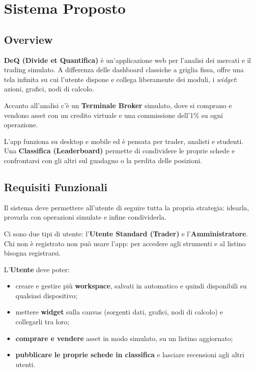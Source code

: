 \section{Sistema Proposto}

\subsection{Overview}
\textbf{DeQ (Divide et Quantifica)} è un'applicazione web per l'analisi dei mercati e il trading simulato. A differenza delle dashboard classiche a griglia fissa, offre una tela infinita su cui l'utente dispone e collega liberamente dei moduli, i \textit{widget}: azioni, grafici, nodi di calcolo.

Accanto all'analisi c'è un \textbf{Terminale Broker} simulato, dove si comprano e vendono asset con un credito virtuale e una commissione dell'1\% su ogni operazione.

L'app funziona su desktop e mobile ed è pensata per trader, analisti e studenti. Una \textbf{Classifica (Leaderboard)} permette di condividere le proprie schede e confrontarsi con gli altri sul guadagno o la perdita delle posizioni.

\subsection{Requisiti Funzionali}
Il sistema deve permettere all'utente di seguire tutta la propria strategia: idearla, provarla con operazioni simulate e infine condividerla.

Ci sono due tipi di utente: l'\textbf{Utente Standard (Trader)} e l'\textbf{Amministratore}. Chi non è registrato non può usare l'app: per accedere agli strumenti e al listino bisogna registrarsi.

L'\textbf{Utente} deve poter:
\begin{itemize}[itemsep=-2pt]
    \item creare e gestire più \textbf{workspace}, salvati in automatico e quindi disponibili su qualsiasi dispositivo;
    \item mettere \textbf{widget} sulla canvas (sorgenti dati, grafici, nodi di calcolo) e collegarli tra loro;
    \item \textbf{comprare e vendere} asset in modo simulato, su un listino aggiornato;
    \item \textbf{pubblicare le proprie schede in classifica} e lasciare recensioni agli altri utenti.
\end{itemize}

